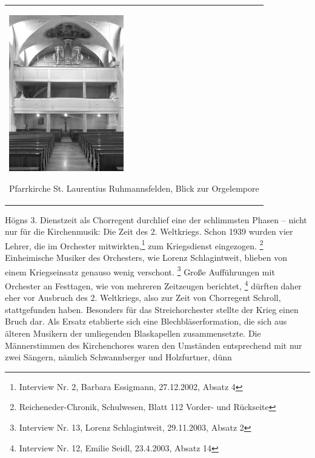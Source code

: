 \begin{center}
\begin{minipage}{5.593cm}
\begin{flushleft}
\tablefirsthead{}
\tablehead{}
\tabletail{}
\tablelasttail{}
\begin{supertabular}{m{5.393cm}}

\includegraphics[width=5.001cm,height=6.805cm]{pictures/zulassungsarbeit-img037.jpg}

Pfarrkirche St. Laurentius
Ruhmannsfelden, Blick zur Orgelempore\\
\end{supertabular}
\end{flushleft}
\end{minipage}
\end{center}
Högns 3. Dienstzeit als Chorregent durchlief eine der schlimmsten Phasen
– nicht nur für die Kirchenmusik: Die Zeit des 2. Weltkriegs. Schon
1939 wurden vier Lehrer, die im Orchester mitwirkten,\footnote{
Interview Nr. 2, Barbara Essigmann, 27.12.2002, Absatz 4} zum
Kriegsdienst eingezogen. \footnote{Reicheneder-Chronik, Schulwesen,
Blatt 112 Vorder- und Rückseite} Einheimische Musiker des Orchesters,
wie Lorenz Schlagintweit, blieben von einem Kriegseinsatz genauso wenig
verschont. \footnote{Interview Nr. 13, Lorenz Schlagintweit,
29.11.2003, Absatz 2} Große Aufführungen mit Orchester an Festtagen,
wie von mehreren Zeitzeugen berichtet, \footnote{Interview Nr. 12,
Emilie Seidl, 23.4.2003, Absatz 14} dürften daher eher vor Ausbruch des
2. Weltkriegs, also zur Zeit von Chorregent Schroll, stattgefunden
haben. Besonders für das Streichorchester stellte der Krieg einen Bruch
dar. Als Ersatz etablierte sich eine Blechbläserformation, die sich aus
älteren Musikern der umliegenden Blaskapellen zusammensetzte. Die
Männerstimmen des Kirchenchores waren den Umständen entsprechend mit
nur zwei Sängern, nämlich Schwannberger und Holzfurtner, dünn
